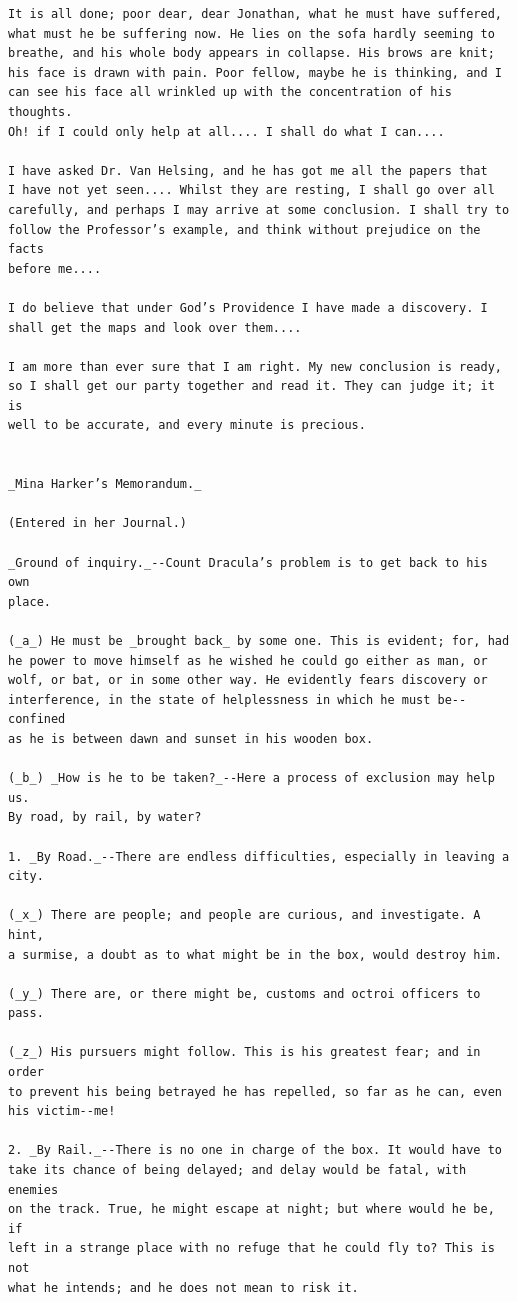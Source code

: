 \documentclass{article}
\begin{document}
\begin{verbatim}
It is all done; poor dear, dear Jonathan, what he must have suffered,
what must he be suffering now. He lies on the sofa hardly seeming to
breathe, and his whole body appears in collapse. His brows are knit;
his face is drawn with pain. Poor fellow, maybe he is thinking, and I
can see his face all wrinkled up with the concentration of his thoughts.
Oh! if I could only help at all.... I shall do what I can....

I have asked Dr. Van Helsing, and he has got me all the papers that
I have not yet seen.... Whilst they are resting, I shall go over all
carefully, and perhaps I may arrive at some conclusion. I shall try to
follow the Professor’s example, and think without prejudice on the facts
before me....

I do believe that under God’s Providence I have made a discovery. I
shall get the maps and look over them....

I am more than ever sure that I am right. My new conclusion is ready,
so I shall get our party together and read it. They can judge it; it is
well to be accurate, and every minute is precious.


_Mina Harker’s Memorandum._

(Entered in her Journal.)

_Ground of inquiry._--Count Dracula’s problem is to get back to his own
place.

(_a_) He must be _brought back_ by some one. This is evident; for, had
he power to move himself as he wished he could go either as man, or
wolf, or bat, or in some other way. He evidently fears discovery or
interference, in the state of helplessness in which he must be--confined
as he is between dawn and sunset in his wooden box.

(_b_) _How is he to be taken?_--Here a process of exclusion may help us.
By road, by rail, by water?

1. _By Road._--There are endless difficulties, especially in leaving a
city.

(_x_) There are people; and people are curious, and investigate. A hint,
a surmise, a doubt as to what might be in the box, would destroy him.

(_y_) There are, or there might be, customs and octroi officers to pass.

(_z_) His pursuers might follow. This is his greatest fear; and in order
to prevent his being betrayed he has repelled, so far as he can, even
his victim--me!

2. _By Rail._--There is no one in charge of the box. It would have to
take its chance of being delayed; and delay would be fatal, with enemies
on the track. True, he might escape at night; but where would he be, if
left in a strange place with no refuge that he could fly to? This is not
what he intends; and he does not mean to risk it.


\end{verbatim}
\end{document}
